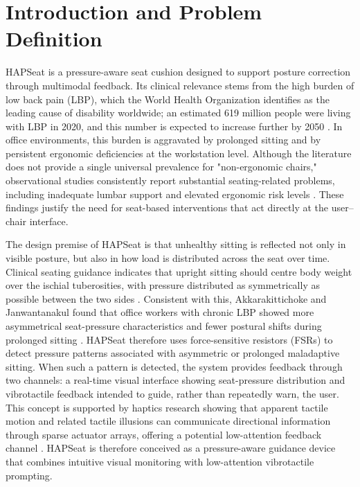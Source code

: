 \documentclass[11pt, a4paper]{article}
\begin{document}
\section{Introduction and Problem Definition}

HAPSeat is a pressure-aware seat cushion designed to support posture correction through multimodal feedback. Its clinical relevance stems from the high burden of low back pain (LBP), which the World Health Organization identifies as the leading cause of disability worldwide; an estimated 619 million people were living with LBP in 2020, and this number is expected to increase further by 2050 \cite{WHO_LBP}. In office environments, this burden is aggravated by prolonged sitting and by persistent ergonomic deficiencies at the workstation level. Although the literature does not provide a single universal prevalence for "non-ergonomic chairs," observational studies consistently report substantial seating-related problems, including inadequate lumbar support and elevated ergonomic risk levels \cite{Sonne2012ROSA, Shahwan2021, Mohammadian2025}. These findings justify the need for seat-based interventions that act directly at the user--chair interface.

The design premise of HAPSeat is that unhealthy sitting is reflected not only in visible posture, but also in how load is distributed across the seat over time. Clinical seating guidance indicates that upright sitting should centre body weight over the ischial tuberosities, with pressure distributed as symmetrically as possible between the two sides \cite{QueenslandSeating}. Consistent with this, Akkarakittichoke and Janwantanakul found that office workers with chronic LBP showed more asymmetrical seat-pressure characteristics and fewer postural shifts during prolonged sitting \cite{Akkarakittichoke2017}. HAPSeat therefore uses force-sensitive resistors (FSRs) to detect pressure patterns associated with asymmetric or prolonged maladaptive sitting. When such a pattern is detected, the system provides feedback through two channels: a real-time visual interface showing seat-pressure distribution and vibrotactile feedback intended to guide, rather than repeatedly warn, the user. This concept is supported by haptics research showing that apparent tactile motion and related tactile illusions can communicate directional information through sparse actuator arrays, offering a potential low-attention feedback channel \cite{Israr2011TactileBrush, Israr2011ControlSpace, Pascher2023HaptiX}. HAPSeat is therefore conceived as a pressure-aware guidance device that combines intuitive visual monitoring with low-attention vibrotactile prompting.
\end{document}
